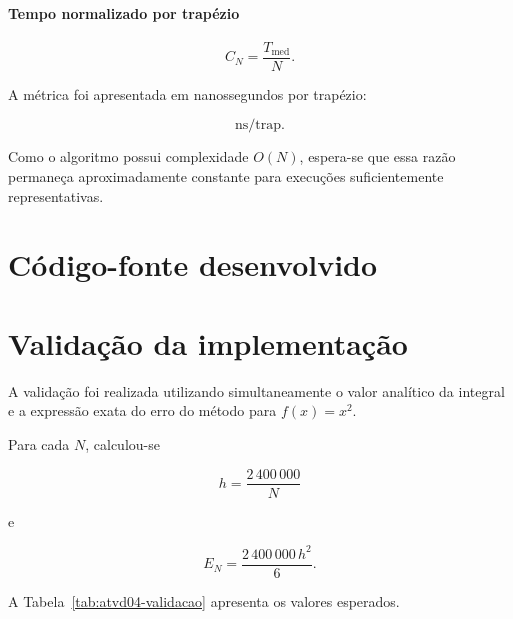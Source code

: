 \paragraph{Tempo normalizado por trapézio}

\begin{equation}
    C_N =
    \frac{T_{\text{med}}}{N}.
\end{equation}

A métrica foi apresentada em nanossegundos por trapézio:

\begin{equation}
    \text{ns/trap}.
\end{equation}

Como o algoritmo possui complexidade \(O(N)\), espera-se que essa razão
permaneça aproximadamente constante para execuções suficientemente
representativas.


\section{Código-fonte desenvolvido}

\label{sec:atvd04-codigo}




\section{Validação da implementação}

\label{sec:atvd04-validacao}

A validação foi realizada utilizando simultaneamente o valor analítico da
integral e a expressão exata do erro do método para \(f(x)=x^2\).

Para cada \(N\), calculou-se

\begin{equation}
    h=\frac{2\,400\,000}{N}
\end{equation}

e

\begin{equation}
    E_N=
    \frac{2\,400\,000\,h^2}{6}.
\end{equation}

A Tabela~\ref{tab:atvd04-validacao} apresenta os valores esperados.

